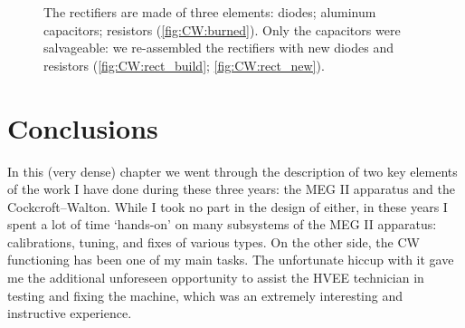 \begin{refsection}
\begin{figure}[ht]
            \hfill
            \caption[CW: assembly of a rectifier]{The rectifiers are made of three elements: diodes; aluminum capacitors; resistors (\ref{fig:CW:burned}). Only the capacitors were salvageable: we re-assembled the rectifiers with new diodes and resistors (\ref{fig:CW:rect_build}; \ref{fig:CW:rect_new}).}
            \label{fig:CW:fixed}
        \end{figure}

\section{Conclusions}
In this (very dense) chapter we went through the description of two key elements of the work I have done during these three years: the MEG II apparatus and the Cockcroft–Walton.
While I took no part in the design of either, in these years I spent a lot of time `hands-on' on many subsystems of the MEG II apparatus: calibrations, tuning, and fixes of various types.
On the other side, the CW functioning has been one of my main tasks.
The unfortunate hiccup with it gave me the additional unforeseen opportunity to assist the HVEE technician in testing and fixing the machine, which was an extremely interesting and instructive experience. 

\printbibliography[
    heading = bibliographychapter,
    title=Bibliography on MEG II
]

\end{refsection}
